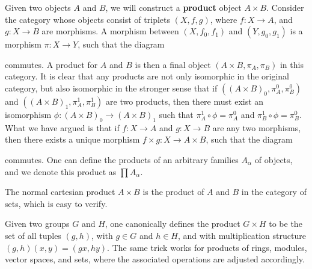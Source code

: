 Given two objects $A$ and $B$, we will construct a {\bf product} object $A \times B$. Consider the category whose objects consist of triplets $(X,f,g)$, where $f: X \to A$, and $g: X \to B$ are morphisms. A morphism between $(X,f_0,f_1)$ and $(Y,g_0,g_1)$ is a morphism $\pi: X \to Y$, such that the diagram
%
\begin{center}
\end{center}
%
commutes. A product for $A$ and $B$ is then a final object $(A \times B, \pi_A, \pi_B)$ in this category. It is clear that any products are not only isomorphic in the original category, but also isomorphic in the stronger sense that if $((A \times B)_0, \pi_A^0, \pi_B^0)$ and $((A \times B)_1, \pi_A^1, \pi_B^1)$ are two products, then there must exist an isomorphism $\phi: (A \times B)_0 \to (A \times B)_1$ such that $\pi^1_A \circ \phi = \pi^0_A$ and $\pi^1_B \circ \phi = \pi^0_B$. What we have argued is that if $f: X \to A$ and $g: X \to B$ are any two morphisms, then there exists a unique morphism $f \times g: X \to A \times B$, such that the diagram
%
\begin{center}
\end{center}
%
commutes. One can define the products of an arbitrary families $A_\alpha$ of objects, and we denote this product as $\prod A_\alpha$.

\begin{example}
    The normal cartesian product $A \times B$ is the product of $A$ and $B$ in the category of sets, which is easy to verify.
\end{example}

\begin{example}
    Given two groups $G$ and $H$, one canonically defines the product $G \times H$ to be the set of all tuples $(g,h)$, with $g \in G$ and $h \in H$, and with multiplication structure $(g,h)(x,y) = (gx,hy)$. The same trick works for products of rings, modules, vector spaces, and sets, where the associated operations are adjusted accordingly.
\end{example}

